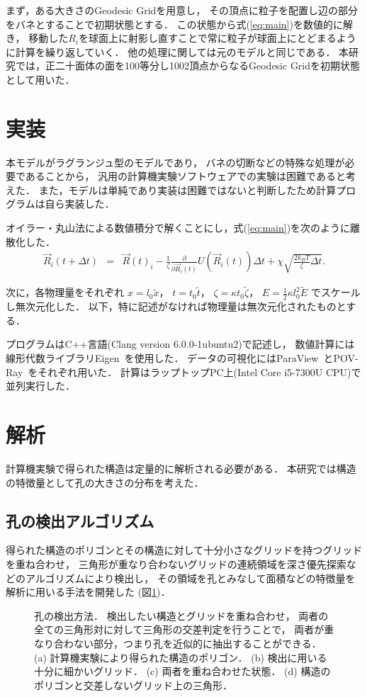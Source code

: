 まず，ある大きさのGeodesic Grid\cite{Geodesic}を用意し，
その頂点に粒子を配置し辺の部分をバネとすることで初期状態とする．
この状態から式(\ref{eq:main})を数値的に解き，
移動した$R_i$を球面上に射影し直すことで常に粒子が球面上にとどまるように計算を繰り返していく．
他の処理に関しては元のモデルと同じである．
本研究では，正二十面体の面を100等分し1002頂点からなるGeodesic Gridを初期状態として用いた．


\section{実装}
本モデルがラグランジュ型のモデルであり，
バネの切断などの特殊な処理が必要であることから，
汎用の計算機実験ソフトウェアでの実験は困難であると考えた．
また，モデルは単純であり実装は困難ではないと判断したため計算プログラムは自ら実装した．

オイラー・丸山法による数値積分で解くことにし，式(\ref{eq:main})を次のように離散化した．
\begin{eqnarray}
    \vec{R}_i(t+\Delta t) &=& 
    \vec{R}(t)_i
    -\frac{1}{\zeta}\frac{\partial}{\partial\vec{R}_i(t)}U(\vec{R}_i(t))\Delta t
    +\chi\sqrt{\frac{2k_B T}{\zeta}\Delta t}
    .
\end{eqnarray}

次に，各物理量をそれぞれ
$x=l_0 \tilde{x}$，
$t=t_0 \tilde{t}$，
$\zeta=\kappa t_0 \tilde{\zeta}$，
$E=\frac{1}{2}\kappa l_0^2\tilde{E}$
でスケールし無次元化した．
以下，特に記述がなければ物理量は無次元化されたものとする．

プログラムはC++言語(Clang version 6.0.0-1ubuntu2)で記述し，
数値計算には線形代数ライブラリEigen~\cite{eigenweb}を使用した．
データの可視化にはParaView~\cite{paraview}とPOV-Ray~\cite{povray}をそれぞれ用いた．
計算はラップトップPC上(Intel Core i5-7300U CPU)で並列実行した．


\section{解析}
計算機実験で得られた構造は定量的に解析される必要がある．
本研究では構造の特徴量として孔の大きさの分布を考えた．


\subsection{孔の検出アルゴリズム}
得られた構造のポリゴンとその構造に対して十分小さなグリッドを持つグリッドを重ね合わせ，
三角形が重なり合わないグリッドの連続領域を深さ優先探索などのアルゴリズムにより検出し，
その領域を孔とみなして面積などの特徴量を解析に用いる手法を開発した
(図\ref{fig:xor})．
\begin{figure}
    \centering
    
    \caption{
        孔の検出方法．
        検出したい構造とグリッドを重ね合わせ，
        両者の全ての三角形対に対して三角形の交差判定を行うことで，
        両者が重なり合わない部分，つまり孔を近似的に抽出することができる．
        (a) 計算機実験により得られた構造のポリゴン．
        (b) 検出に用いる十分に細かいグリッド．
        (c) 両者を重ね合わせた状態．
        (d) 構造のポリゴンと交差しないグリッド上の三角形．
    }
    \label{fig:xor}
\end{figure}

